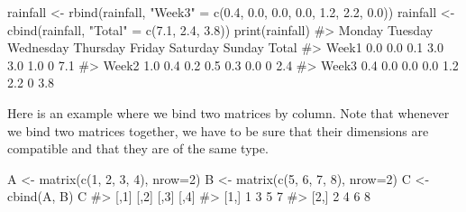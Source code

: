 \documentclass[
  letterpaper,
]{latex/krantz}
\makeatletter
\newenvironment{Shaded}{\begin{snugshade}}{\end{snugshade}}
\newcommand{\AttributeTok}[1]{\textcolor[rgb]{0.40,0.45,0.13}{#1}}
\newcommand{\CommentTok}[1]{\textcolor[rgb]{0.37,0.37,0.37}{#1}}
\newcommand{\DecValTok}[1]{\textcolor[rgb]{0.68,0.00,0.00}{#1}}
\newcommand{\FloatTok}[1]{\textcolor[rgb]{0.68,0.00,0.00}{#1}}
\newcommand{\FunctionTok}[1]{\textcolor[rgb]{0.28,0.35,0.67}{#1}}
\newcommand{\NormalTok}[1]{\textcolor[rgb]{0.00,0.23,0.31}{#1}}
\newcommand{\OtherTok}[1]{\textcolor[rgb]{0.00,0.23,0.31}{#1}}
\newcommand{\StringTok}[1]{\textcolor[rgb]{0.13,0.47,0.30}{#1}}
\newenvironment{kframe}{%
\medskip{}
\setlength{\fboxsep}{.8em}
 \def\at@end@of@kframe{}%
 \ifinner\ifhmode%
  \def\at@end@of@kframe{\end{minipage}}%
  \begin{minipage}{\columnwidth}%
 \fi\fi%
 \def\FrameCommand##1{\hskip\@totalleftmargin \hskip-\fboxsep
 \colorbox{shadecolor}{##1}\hskip-\fboxsep
     \hskip-\linewidth \hskip-\@totalleftmargin \hskip\columnwidth}%
 \MakeFramed {\advance\hsize-\width
   \@totalleftmargin\z@ \linewidth\hsize
   \@setminipage}}%
 {\par\unskip\endMakeFramed%
 \at@end@of@kframe}
\renewenvironment{Shaded}{\begin{kframe}}{\end{kframe}}
\makeatother
\begin{document}
\begin{Shaded}
\begin{Highlighting}[]
\NormalTok{rainfall }\OtherTok{\textless{}{-}} \FunctionTok{rbind}\NormalTok{(rainfall, }\StringTok{"Week3"} \OtherTok{=} \FunctionTok{c}\NormalTok{(}\FloatTok{0.4}\NormalTok{, }\FloatTok{0.0}\NormalTok{, }\FloatTok{0.0}\NormalTok{, }\FloatTok{0.0}\NormalTok{, }\FloatTok{1.2}\NormalTok{, }\FloatTok{2.2}\NormalTok{, }
                                        \FloatTok{0.0}\NormalTok{))}
\NormalTok{rainfall }\OtherTok{\textless{}{-}} \FunctionTok{cbind}\NormalTok{(rainfall, }\StringTok{"Total"} \OtherTok{=} \FunctionTok{c}\NormalTok{(}\FloatTok{7.1}\NormalTok{, }\FloatTok{2.4}\NormalTok{, }\FloatTok{3.8}\NormalTok{))}
\FunctionTok{print}\NormalTok{(rainfall)}
\CommentTok{\#\textgreater{}       Monday Tuesday Wednesday Thursday Friday Saturday Sunday Total}
\CommentTok{\#\textgreater{} Week1    0.0     0.0       0.1      3.0    3.0      1.0      0   7.1}
\CommentTok{\#\textgreater{} Week2    1.0     0.4       0.2      0.5    0.3      0.0      0   2.4}
\CommentTok{\#\textgreater{} Week3    0.4     0.0       0.0      0.0    1.2      2.2      0   3.8}
\end{Highlighting}
\end{Shaded}

Here is an example where we bind two matrices by column. Note that
whenever we bind two matrices together, we have to be sure that their
dimensions are compatible and that they are of the same type.

\begin{Shaded}
\begin{Highlighting}[]
\NormalTok{A }\OtherTok{\textless{}{-}} \FunctionTok{matrix}\NormalTok{(}\FunctionTok{c}\NormalTok{(}\DecValTok{1}\NormalTok{, }\DecValTok{2}\NormalTok{, }\DecValTok{3}\NormalTok{, }\DecValTok{4}\NormalTok{), }\AttributeTok{nrow=}\DecValTok{2}\NormalTok{)}
\NormalTok{B }\OtherTok{\textless{}{-}} \FunctionTok{matrix}\NormalTok{(}\FunctionTok{c}\NormalTok{(}\DecValTok{5}\NormalTok{, }\DecValTok{6}\NormalTok{, }\DecValTok{7}\NormalTok{, }\DecValTok{8}\NormalTok{), }\AttributeTok{nrow=}\DecValTok{2}\NormalTok{)}
\NormalTok{C }\OtherTok{\textless{}{-}} \FunctionTok{cbind}\NormalTok{(A, B)}
\NormalTok{C}
\CommentTok{\#\textgreater{}      [,1] [,2] [,3] [,4]}
\CommentTok{\#\textgreater{} [1,]    1    3    5    7}
\CommentTok{\#\textgreater{} [2,]    2    4    6    8}
\end{Highlighting}
\end{Shaded}
\end{document}
